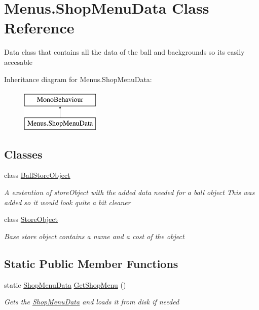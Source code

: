 \hypertarget{class_menus_1_1_shop_menu_data}{}\section{Menus.\+Shop\+Menu\+Data Class Reference}
\label{class_menus_1_1_shop_menu_data}


Data class that contains all the data of the ball and backgrounds so it\textquotesingle{}s easily accesable  


Inheritance diagram for Menus.\+Shop\+Menu\+Data\+:\begin{figure}[H]
\begin{center}
\leavevmode
\includegraphics[height=2.000000cm]{class_menus_1_1_shop_menu_data}
\end{center}
\end{figure}
\subsection*{Classes}
\begin{DoxyCompactItemize}
\item 
class \hyperlink{class_menus_1_1_shop_menu_data_1_1_ball_store_object}{Ball\+Store\+Object}
\begin{DoxyCompactList}\small\item\em A exstention of store\+Object with the added data needed for a ball object This was added so it would look quite a bit cleaner \end{DoxyCompactList}\item 
class \hyperlink{class_menus_1_1_shop_menu_data_1_1_store_object}{Store\+Object}
\begin{DoxyCompactList}\small\item\em Base store object contains a name and a cost of the object \end{DoxyCompactList}\end{DoxyCompactItemize}
\subsection*{Static Public Member Functions}
\begin{DoxyCompactItemize}
\item 
static \hyperlink{class_menus_1_1_shop_menu_data}{Shop\+Menu\+Data} \hyperlink{class_menus_1_1_shop_menu_data_ab8dbcd741f9b3cc655e57d5ef2a3495b}{Get\+Shop\+Menu} ()
\begin{DoxyCompactList}\small\item\em Gets the \hyperlink{class_menus_1_1_shop_menu_data}{Shop\+Menu\+Data} and loads it from disk if needed \end{DoxyCompactList}\end{DoxyCompactItemize}
